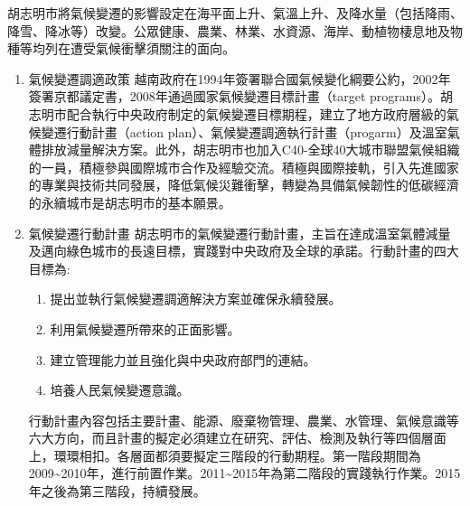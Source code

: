 \documentclass[a4paper,12pt]{article}
\begin{document}
\begin{enumerate}
胡志明市將氣候變遷的影響設定在海平面上升、氣溫上升、及降水量（包括降雨、降雪、降冰等）改變。公眾健康、農業、林業、水資源、海岸、動植物棲息地及物種等均列在遭受氣候衝擊須關注的面向。\\
\begin{enumerate}
\item 氣候變遷調適政策
\label{sec:orgbcc9f1c}
越南政府在1994年簽署聯合國氣候變化綱要公約，2002年簽署京都議定書，2008年通過國家氣候變遷目標計畫（target programs）。胡志明市配合執行中央政府制定的氣候變遷目標期程，建立了地方政府層級的氣候變遷行動計畫（action plan）、氣候變遷調適執行計畫（progarm）及溫室氣體排放減量解決方案。此外，胡志明市也加入C40-全球40大城市聯盟氣候組織的一員，積極參與國際城市合作及經驗交流。積極與國際接軌，引入先進國家的專業與技術共同發展，降低氣候災難衝擊，轉變為具備氣候韌性的低碳經濟的永續城市是胡志明市的基本願景。\\
\item 氣候變遷行動計畫
\label{sec:org1e9aa75}
胡志明市的氣候變遷行動計畫，主旨在達成溫室氣體減量及邁向綠色城市的長遠目標，實踐對中央政府及全球的承諾。行動計畫的四大目標為:\\
\begin{enumerate}
\item 提出並執行氣候變遷調適解決方案並確保永續發展。\\
\item 利用氣候變遷所帶來的正面影響。\\
\item 建立管理能力並且強化與中央政府部門的連結。\\
\item 培養人民氣候變遷意識。\\
\end{enumerate}
行動計畫內容包括主要計畫、能源、廢棄物管理、農業、水管理、氣候意識等六大方向，而且計畫的擬定必須建立在研究、評估、檢測及執行等四個層面上，環環相扣。各層面都須要擬定三階段的行動期程。第一階段期間為2009\textasciitilde{}2010年，進行前置作業。2011\textasciitilde{}2015年為第二階段的實踐執行作業。2015年之後為第三階段，持續發展。\\


\end{enumerate}
\end{enumerate}
\end{document}
